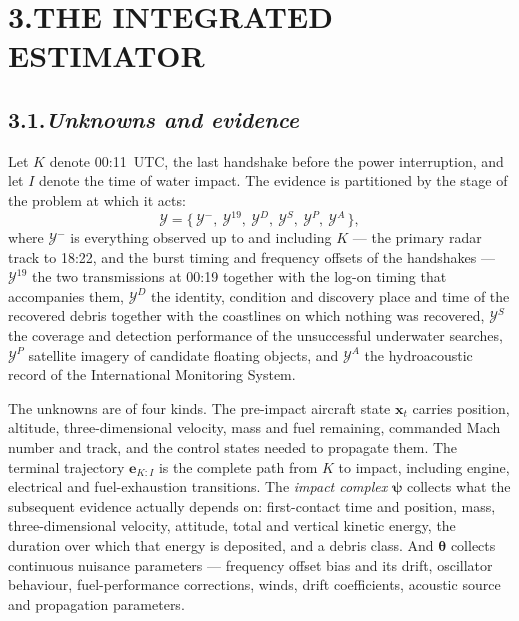 \documentclass[12pt,a4paper]{article}
\newcommand{\Ev}{\mathcal{Y}}
\newcommand{\state}{\mathbf{x}}
\newcommand{\impact}{\boldsymbol{\psi}}
\newcommand{\traj}{\mathbf{e}}
\newcommand{\nuis}{\boldsymbol{\theta}}
\begin{document}
\section*{3.\quad THE INTEGRATED ESTIMATOR}

\subsection*{3.1.\quad \textit{Unknowns and evidence}}

Let $K$ denote 00:11~UTC, the last handshake before the power interruption, and let $I$ denote
the time of water impact. The evidence is partitioned by the stage of the problem at which it
acts:
%
\begin{equation}
\Ev = \bigl\{\,\Ev^{-},\ \Ev^{19},\ \Ev^{D},\ \Ev^{S},\ \Ev^{P},\ \Ev^{A}\,\bigr\},
\end{equation}
%
where $\Ev^{-}$ is everything observed up to and including $K$ --- the primary radar track to
18:22, and the burst timing and frequency offsets of the handshakes --- $\Ev^{19}$ the two
transmissions at 00:19 together with the log-on timing that accompanies them, $\Ev^{D}$ the
identity, condition and discovery place and time of the recovered debris together with the
coastlines on which nothing was recovered, $\Ev^{S}$ the coverage and detection performance of
the unsuccessful underwater searches, $\Ev^{P}$ satellite imagery of candidate floating
objects, and $\Ev^{A}$ the hydroacoustic record of the International Monitoring System.

The unknowns are of four kinds. The pre-impact aircraft state $\state_t$ carries position,
altitude, three-dimensional velocity, mass and fuel remaining, commanded Mach number and track,
and the control states needed to propagate them. The terminal trajectory
$\traj_{K:I}$ is the complete path from $K$ to impact, including engine, electrical and
fuel-exhaustion transitions. The \emph{impact complex} $\impact$ collects what the subsequent
evidence actually depends on: first-contact time and position, mass, three-dimensional velocity,
attitude, total and vertical kinetic energy, the duration over which that energy is deposited,
and a debris class. And $\nuis$ collects continuous nuisance parameters --- frequency offset
bias and its drift, oscillator behaviour, fuel-performance corrections, winds, drift
coefficients, acoustic source and propagation parameters.
\end{document}
